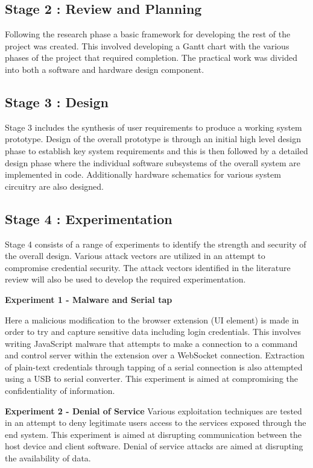 \subsection{Stage 2 : Review and Planning}

Following the research phase a basic framework for developing the rest of the project was created. This involved developing a Gantt chart with the various phases of the project that required completion. The practical work was divided into both a software and hardware design component.

\subsection{Stage 3 : Design}
Stage 3 includes the synthesis of user requirements to produce a working system prototype. Design of the overall prototype is through an initial high level design phase to establish key system requirements and this is then followed by a detailed design phase where the individual software subsystems of the overall system are implemented in code. Additionally hardware schematics for various system circuitry are also designed. 

\subsection{Stage 4 : Experimentation}

Stage 4 consists of a range of experiments to identify the strength and security of the overall design. Various attack vectors are utilized in an attempt to compromise credential security. The attack vectors identified in the literature review will also be used to develop the required experimentation.

\textbf{Experiment 1 - Malware and Serial tap}

Here a malicious modification to the browser extension (UI element) is made in order to try and capture sensitive data including login credentials. This involves writing JavaScript malware that attempts to make a connection to a command and control server within the extension over a WebSocket connection. Extraction of plain-text credentials through tapping of a serial connection is also attempted using a USB to serial converter. This experiment is aimed at compromising the confidentiality of information.

\textbf{Experiment 2 - Denial of Service}
Various exploitation techniques are tested in an attempt to deny legitimate users access to the services exposed through the end system. This experiment is aimed at disrupting communication between the host device and client software. Denial of service attacks are aimed at disrupting the availability of data.

